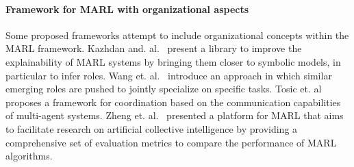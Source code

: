 \documentclass{ecai}
\begin{document}




















\paragraph{\textbf{Framework for MARL with organizational aspects}}
%
Some proposed frameworks attempt to include organizational concepts within the MARL framework.
Kazhdan and. al.~\cite{Kazhdan2020} present a library to improve the explainability of MARL systems by bringing them closer to symbolic models, in particular to infer roles.%
%
Wang et. al.~\cite{Wang2020} introduce an approach in which similar emerging roles are pushed to jointly specialize on specific tasks.
%
Tosic et. al~\cite{Tosic2010} proposes a framework for coordination based on the communication capabilities of multi-agent systems.
%
Zheng et. al.~\cite{Zheng2018} presented a platform for MARL that aims to facilitate research on artificial collective intelligence by providing a comprehensive set of evaluation metrics to compare the performance of MARL algorithms.
\end{document}
